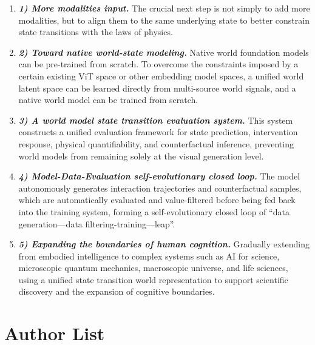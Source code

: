 \documentclass{llmxive}
\providecommand{\currentnavsection}{sec:intro}
\providecommand{\setnavsection}[1]{  \gdef\currentnavsection{#1}}
\begin{document}
\vspace{-1ex}
\begin{enumerate}[
    leftmargin=1.35em,
    itemsep=0.35em,
    topsep=0.35em,
    parsep=0em
]
    \item[] \textit{\textbf{1) More modalities input.}} The crucial next step is not simply to add more modalities, but to align them to the same underlying state to better constrain state transitions with the laws of physics.

    
    \item[] \textit{\textbf{2) Toward native world-state modeling.}} Native world foundation models can be pre-trained from scratch. To overcome the constraints imposed by a certain existing ViT space or other embedding model spaces, a unified world latent space can be learned directly from multi-source world signals, and a native world model can be trained from scratch.
    
    \item[] \textit{\textbf{3) A world model state transition evaluation system.}} This system constructs a unified evaluation framework for state prediction, intervention response, physical quantifiability, and counterfactual inference, preventing world models from remaining solely at the visual generation level. 

    \item[] \textit{\textbf{4) Model-Data-Evaluation self-evolutionary closed loop.}} The model autonomously generates interaction trajectories and counterfactual samples, which are automatically evaluated and value-filtered before being fed back into the training system, forming a self-evolutionary closed loop of ``data generation—data filtering-training—leap''.

    \item[] \textit{\textbf{5) Expanding the boundaries of human cognition.}} Gradually extending from embodied intelligence to complex systems such as AI for science, microscopic quantum mechanics, macroscopic universe, and life sciences, using a unified state transition world representation to support scientific discovery and the expansion of cognitive boundaries.
    

\end{enumerate}
\section{Author List}\label{sec:contributors}
\setnavsection{sec:contributors}
\end{document}
